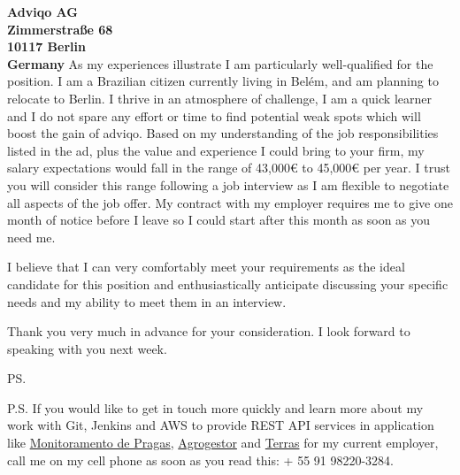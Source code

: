\documentclass[a4paper]{joaosoares-letter}
\begin{document}
\begin{letter}{\bfseries Adviqo AG\\Zimmerstraße 68\\10117 Berlin\\Germany}
As my experiences illustrate I am particularly well-qualified for the position. I am a Brazilian citizen currently living in Belém, and am planning to relocate to Berlin. I thrive in an atmosphere of challenge, I am a quick learner and I do not spare any effort or time to find potential weak spots which will boost the gain of adviqo. Based on my understanding of the job responsibilities listed in the ad, plus the value and experience I could bring to your firm, my salary expectations would fall in the range of 43,000€ to 45,000€ per year. I trust you will consider this range following a job interview as I am flexible to negotiate all aspects of the job offer. My contract with my employer requires me to give one month of notice before I leave so I could start after this month as soon as you need me.

I believe that I can very comfortably meet your requirements as the ideal candidate for this position and enthusiastically anticipate discussing your specific needs and my ability to meet them in an interview.

\closing{Thank you very much in advance for your consideration. I look forward to speaking with you next week.}
\vspace{10pt}
\ps


P.S. If you would like to get in touch more quickly and learn more about my work with Git, Jenkins and AWS to provide REST API services in application like \href{https://goo.gl/RcdbHk}{Monitoramento de Pragas}, \href{https://goo.gl/mycBmL}{Agrogestor} and \href{https://goo.gl/OyZXke}{Terras} for my current employer, call me on my cell phone as soon as you read this: + 55 91 98220-3284.
\vspace{\fill}

\end{letter}
\end{document}
